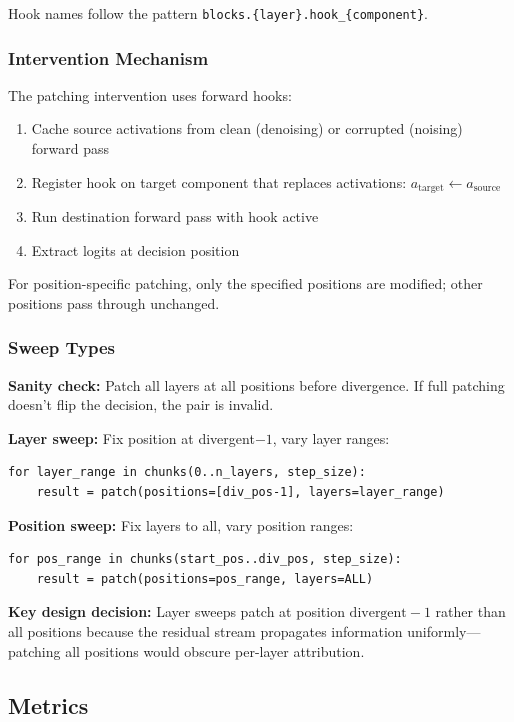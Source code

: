 \documentclass{article}
\begin{document}
Hook names follow the pattern \texttt{blocks.\{layer\}.hook\_\{component\}}.

\subsubsection{Intervention Mechanism}

The patching intervention uses forward hooks:
\begin{enumerate}
    \item Cache source activations from clean (denoising) or corrupted (noising) forward pass
    \item Register hook on target component that replaces activations: $a_{\text{target}} \leftarrow a_{\text{source}}$
    \item Run destination forward pass with hook active
    \item Extract logits at decision position
\end{enumerate}

For position-specific patching, only the specified positions are modified; other positions pass through unchanged.

\subsubsection{Sweep Types}

\textbf{Sanity check:} Patch all layers at all positions before divergence. If full patching doesn't flip the decision, the pair is invalid.

\textbf{Layer sweep:} Fix position at divergent$-1$, vary layer ranges:
\begin{verbatim}
for layer_range in chunks(0..n_layers, step_size):
    result = patch(positions=[div_pos-1], layers=layer_range)
\end{verbatim}

\textbf{Position sweep:} Fix layers to all, vary position ranges:
\begin{verbatim}
for pos_range in chunks(start_pos..div_pos, step_size):
    result = patch(positions=pos_range, layers=ALL)
\end{verbatim}

\textbf{Key design decision:} Layer sweeps patch at position $\text{divergent}-1$ rather than all positions because the residual stream propagates information uniformly---patching all positions would obscure per-layer attribution.

\subsection{Metrics}
\end{document}
